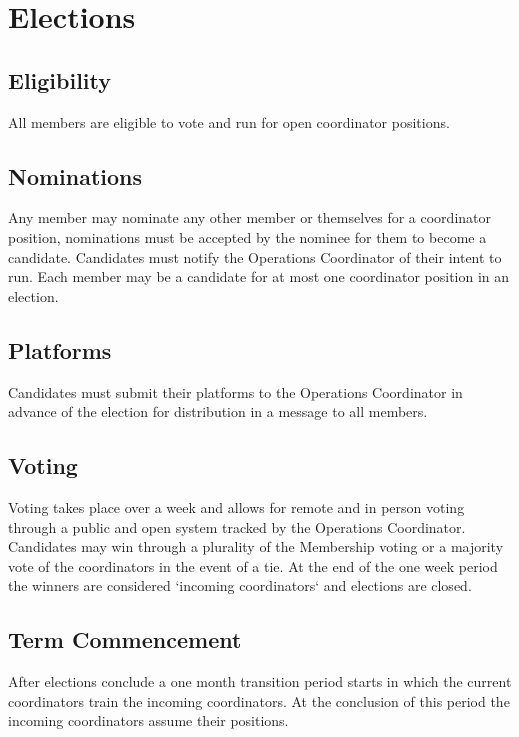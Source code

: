 \chapter{Elections}\label{sec:elections}

\section{Eligibility}\label{sec:eligibility}
All members are eligible to vote and run for open coordinator positions.

\section{Nominations}\label{sec:nominations}
Any member may nominate any other member or themselves for a coordinator position, nominations must be accepted by the nominee for them to become a candidate. Candidates must notify the Operations Coordinator of their intent to run. Each member may be a candidate for at most one coordinator position in an election.

\section{Platforms}\label{sec:platforms}
Candidates must submit their platforms to the Operations Coordinator in advance of the election for distribution in a message to all members.

\section{Voting}\label{sec:voting}
Voting takes place over a week and allows for remote and in person voting through a public and open system tracked by the Operations Coordinator. Candidates may win through a plurality of the Membership voting or a majority vote of the coordinators in the event of a tie. At the end of the one week period the winners are considered `incoming coordinators` and elections are closed.

\section{Term Commencement}\label{sec:term_commencement}
After elections conclude a one month transition period starts in which the current coordinators train the incoming coordinators. At the conclusion of this period the incoming coordinators assume their positions.
